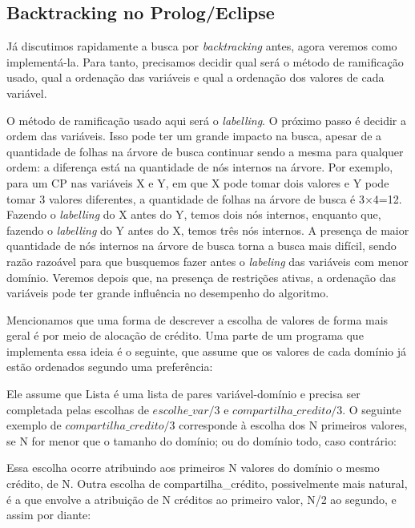 \documentclass{article}
\begin{document}
\subsection{Backtracking no Prolog/Eclipse}

Já discutimos rapidamente a busca por \textit{backtracking} antes, agora veremos como implementá-la. Para tanto, precisamos decidir qual será o método de ramificação usado, qual a ordenação das variáveis e qual a ordenação dos valores de cada variável.

O método de ramificação usado aqui será o \textit{labelling}. O próximo passo é decidir a ordem das variáveis. Isso pode ter um grande impacto na busca, apesar de a quantidade de folhas na árvore de busca continuar sendo a mesma para qualquer ordem: a diferença está na quantidade de nós internos na árvore. Por exemplo, para um CP nas variáveis X e Y, em que X pode tomar dois valores e Y pode tomar 3 valores diferentes, a quantidade de folhas na árvore de busca é 3$\times$4=12. Fazendo o \textit{labelling}
do X antes do Y, temos dois nós internos, enquanto que, fazendo o \textit{labelling} do Y antes do X, temos três nós internos. A presença de maior quantidade de nós internos na árvore de busca torna a busca mais difícil, sendo razão razoável para que busquemos fazer antes o \textit{labeling} das variáveis com menor domínio. Veremos depois que, na presença de restrições ativas, a ordenação das variáveis pode ter grande influência no desempenho do algoritmo.

Mencionamos que uma forma de descrever a escolha de valores de forma mais geral é por meio de alocação de crédito. Uma parte de um programa que implementa essa ideia é o seguinte, que assume que os valores de cada domínio já estão ordenados segundo uma preferência:



Ele assume que Lista é uma lista de pares variável-domínio e precisa ser completada pelas escolhas de $escolhe\_var/3$ e $compartilha\_credito/3$. O seguinte exemplo de $compartilha\_credito/3$ corresponde à escolha dos N primeiros valores, se N for menor
que o tamanho do domínio; ou do domínio todo,
caso contrário:



Essa escolha ocorre atribuindo aos primeiros N valores do domínio o mesmo crédito, de N. Outra escolha de compartilha\_crédito, possivelmente mais natural, é a que envolve a atribuição de N créditos ao primeiro valor, N/2 ao segundo, e assim por diante:
\end{document}
